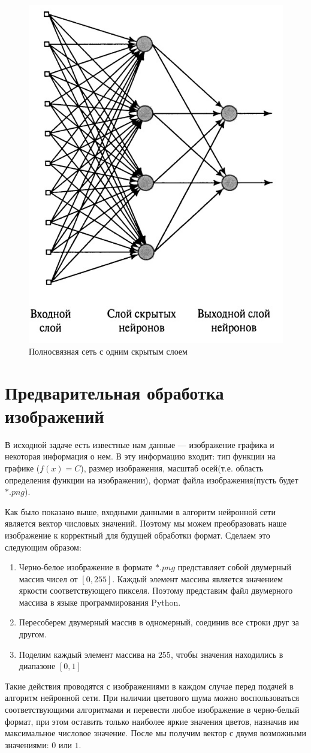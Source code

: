 \documentclass[12pt, a4paper]{article}
\begin{document}
	\begin{figure}[!h]
		\centering
		\includegraphics[width=0.3\linewidth]{web}
		\caption{Полносвязная сеть с одним скрытым слоем}
		\label{neiron}
	\end{figure}
	
	\section{Предварительная обработка изображений}
	В исходной задаче есть известные нам данные --- изображение графика и некоторая информация о нем. В эту информацию входит: тип функции на графике ($f(x) = C $), размер изображения, масштаб осей(т.е. область определения функции на изображении), формат файла изображения(пусть будет $*.png$).
	
	Как было показано выше, входными данными в алгоритм нейронной сети является вектор числовых значений. Поэтому мы можем преобразовать наше изображение к корректный для будущей обработки формат. Сделаем это следующим образом:
	
	\begin{enumerate}
		\item Черно-белое изображение в формате $*.png$ представляет собой двумерный массив чисел от $[0, 255]$. Каждый элемент массива является значением яркости соответствующего пикселя. Поэтому представим файл двумерного массива в языке программирования Python. 
		\item Пересоберем двумерный массив в одномерный, соединив все строки друг за другом.
		\item Поделим каждый элемент массива на $255$, чтобы значения находились в диапазоне $[0, 1]$
	\end{enumerate}
	
	Такие действия проводятся с изображениями в каждом случае перед подачей в алгоритм нейронной сети. При наличии цветового шума можно воспользоваться соответствующими алгоритмами и перевести любое изображение в черно-белый формат, при этом оставить только наиболее яркие значения цветов, назначив им максимальное числовое значение. После мы получим вектор с двумя возможными значениями: $0$ или $1$.
\end{document}
